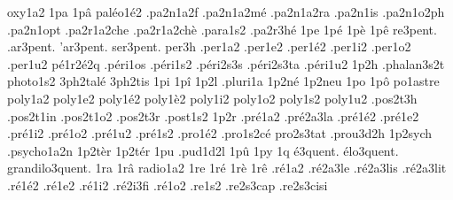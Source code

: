 {                    oxy1a2
1pa
1p\^a
                    pal\'eo1\'e2
                    .pa2n1a2f
                    .pa2n1a2m\'e
                    .pa2n1a2ra
                    .pa2n1is
                    .pa2n1o2ph
                    .pa2n1opt
                    .pa2r1a2che
                    .pa2r1a2ch\`e
                    .para1s2
                    .pa2r3h\'e
1pe
1p\'e
1p\`e
1p\^e
 re3pent.
.ar3pent.
'ar3pent.
ser3pent.
                    per3h
                    .per1a2
                    .per1e2
                    .per1\'e2
                    .per1i2
                    .per1o2
                    .per1u2
                    p\'e1r2\'e2q %
                    .p\'eri1os
                    .p\'eri1s2
                    .p\'eri2s3s
                    .p\'eri2s3ta
                    .p\'eri1u2
1p2h
                    .phalan3s2t
                    photo1s2
                    3ph2tal\'e
                    3ph2tis
1pi
1p\^i
1p2l
                    .pluri1a
                    1p2n\'e
                    1p2neu
1po
1p\^o
                    po1astre
                    poly1a2
                    poly1e2
                    poly1\'e2
                    poly1\`e2
                    poly1i2
                    poly1o2
                    poly1s2
                    poly1u2
                    .pos2t3h
                    .pos2t1in
                    .pos2t1o2
                    .pos2t3r
                    .post1s2
1p2r
                    .pr\'e1a2
                    .pr\'e2a3la %
                    .pr\'e1\'e2
                    .pr\'e1e2
                    .pr\'e1i2
                    .pr\'e1o2
                    .pr\'e1u2
                    .pr\'e1s2
                    .pro1\'e2
                    .pro1s2c\'e
                    pro2s3tat
                    .prou3d2h
                    1p2sych
                    .psycho1a2n
                    1p2t\`er
                    1p2t\'er
1pu
                    .pud1d2l
1p\^u
1py
1q
     \'e3quent.
   \'elo3quent.
grandilo3quent.
1ra
1r\^a
                    radio1a2 %
1re
1r\'e
1r\`e
1r\^e
                    .r\'e1a2
                    .r\'e2a3le
                    .r\'e2a3lis
                    .r\'e2a3lit
                    .r\'e1\'e2
                    .r\'e1e2
                    .r\'e1i2
                    .r\'e2i3fi
                    .r\'e1o2
                    .re1s2
                    .re2s3cap
                    .re2s3cisi %
}
